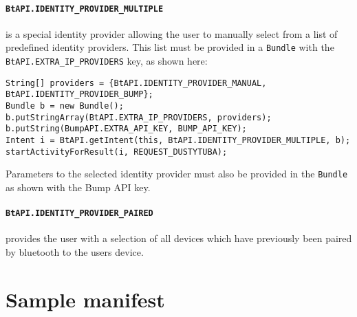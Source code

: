 \documentclass[a4paper,11pt]{article}
\begin{document}
\paragraph{{\tt BtAPI.IDENTITY\_PROVIDER\_MULTIPLE}}
is a special identity provider allowing the user to manually select from a list of predefined identity providers. This list must be provided in a \verb+Bundle+ with the \verb+BtAPI.EXTRA_IP_PROVIDERS+ key, as shown here:

\footnotesize
\begin{verbatim}
String[] providers = {BtAPI.IDENTITY_PROVIDER_MANUAL, BtAPI.IDENTITY_PROVIDER_BUMP};
Bundle b = new Bundle();
b.putStringArray(BtAPI.EXTRA_IP_PROVIDERS, providers);
b.putString(BumpAPI.EXTRA_API_KEY, BUMP_API_KEY);
Intent i = BtAPI.getIntent(this, BtAPI.IDENTITY_PROVIDER_MULTIPLE, b);
startActivityForResult(i, REQUEST_DUSTYTUBA);
\end{verbatim}
\normalsize

Parameters to the selected identity provider must also be provided in the \verb+Bundle+ as shown with the Bump\texttrademark{} API key.

\paragraph{{\tt BtAPI.IDENTITY\_PROVIDER\_PAIRED}}
provides the user with a selection of all devices which have previously been paired by bluetooth to the users device.


\clearpage
\appendix

\section{Sample manifest}
\label{sample-manifest}
\end{document}
